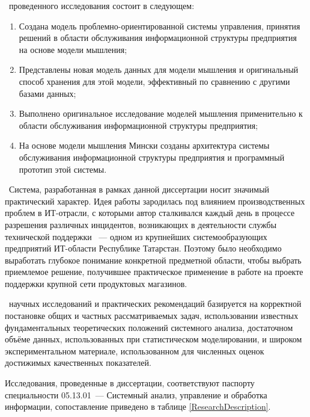 \novelty\ проведенного исследования состоит в следующем:
\begin{enumerate}
  \item Создана модель проблемно-ориентированной системы управления, принятия решений в области обслуживания информационной структуры предприятия на основе модели мышления;
  \item Представлены новая модель данных для модели мышления и оригинальный способ хранения для этой модели, эффективный по сравнению с другими базами данных;
  \item Выполнено оригинальное исследование моделей мышления применительно к области обслуживания информационной структуры предприятия;
  \item На основе модели мышления Мински созданы архитектура системы обслуживания информационной структуры предприятия и программный прототип этой системы.
\end{enumerate}

\influence\ 
Система, разработанная в рамках данной диссертации носит значимый практический характер. Идея работы зародилась под влиянием производственных проблем в ИТ-отрасли, с которыми автор сталкивался каждый день в процессе разрешения различных инцидентов, возникающих в деятельности службы технической поддержки \icl~--- одном из крупнейших системообразующих предприятий ИТ-области Республике Татарстан. Поэтому было необходимо выработать глубокое понимание конкретной предметной области, чтобы выбрать приемлемое решение, получившее практическое применение в работе на проекте поддержки крупной сети продуктовых магазинов. \par
\reliability\ научных исследований и практических рекомендаций
базируется на корректной постановке общих и частных рассматриваемых задач,  использовании известных фундаментальных теоретических положений системного анализа, достаточном объёме данных, использованных при статистическом моделировании, и широком экспериментальном материале, использованном для численных оценок достижимых качественных показателей. \par 
Исследования, проведенные в диссертации, соответствуют паспорту специальности 05.13.01~--- Системный анализ, управление и обработка информации, сопоставление приведено в таблице \ref{ResearchDescription}.

